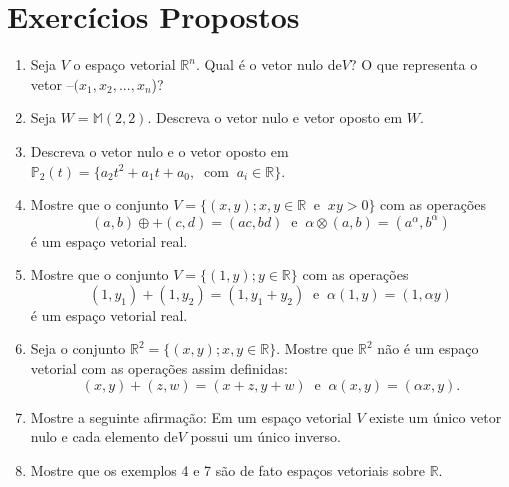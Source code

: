 \section{Exercícios Propostos}

\begin{enumerate}

\item  Seja $V$  o espaço vetorial  $\mathbb{R}^n$. Qual é o vetor nulo de$V$? O que representa o vetor $ – (x_1, x_2,...,x_n$)?

\item  Seja $W=\mathbb{M}(2,2)$. Descreva o vetor nulo e vetor oposto em $W$.

\item Descreva o vetor nulo e o vetor oposto em $\mathbb{P}_2(t)=\{a_2t^2+a_1t+a_0,\; \;\text{com}\; \;  a_i  \in \mathbb{R}\}$.

\item Mostre que o conjunto $V=\{ (x,y); x, y \in \mathbb{R} \; \; \text{e} \; \; xy> 0\}$ com as operações $$ (a,b) \oplus + (c,d)= (ac, bd) \;\; \text{e} \;\; \alpha \otimes (a,b)=(a^{\alpha}, b^{\alpha})$$ é  um espaço vetorial real.

\item  Mostre que o conjunto $V=\{ (1,y);  y \in \mathbb{R}\}$ com as operações $$ (1,y_1) + (1,y_2)= (1, y_1+y_2) \;\; \text{e} \;\; \alpha  (1,y)=(1, {\alpha}y)$$ é  um espaço vetorial real.



\item Seja o conjunto $\mathbb{R}^2=\{(x, y); x, y  \in \mathbb{R}\}$. Mostre que $\mathbb{R}^2$ não é um espaço vetorial com as operações assim definidas:
$$ (x,y) + (z,w)= (x+z, y+w) \;\; \text{e} \;\; \alpha  (x,y)=({\alpha}x, y).$$

\item  Mostre a seguinte afirmação: Em um espaço vetorial $V$ existe um único vetor nulo e cada elemento de$V$ possui um único inverso.

\item Mostre que os exemplos 4 e 7 são de fato espaços vetoriais sobre $\mathbb{R}$.




\end{enumerate}
